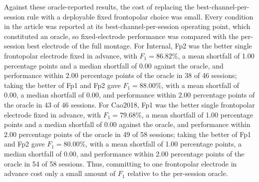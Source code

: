 Against these oracle-reported results, the cost of replacing the best-channel-per-session rule with a deployable fixed frontopolar choice was small.
Every condition in the article was reported at its best-channel-per-session operating point, which constituted an oracle, so fixed-electrode performance was compared with the per-session best electrode of the full montage.
For Internal, Fp2 was the better single frontopolar electrode fixed in advance, with $F_1=86.82\%$, a mean shortfall of 1.00 percentage points and a median shortfall of 0.00 against the oracle, and performance within 2.00 percentage points of the oracle in 38 of 46 sessions; taking the better of Fp1 and Fp2 gave $F_1=88.00\%$, with a mean shortfall of 0.00, a median shortfall of 0.00, and performance within 2.00 percentage points of the oracle in 43 of 46 sessions. For Cao2018, Fp1 was the better single frontopolar electrode fixed in advance, with $F_1=79.68\%$, a mean shortfall of 1.00 percentage points and a median shortfall of 0.00 against the oracle, and performance within 2.00 percentage points of the oracle in 49 of 58 sessions; taking the better of Fp1 and Fp2 gave $F_1=80.00\%$, with a mean shortfall of 1.00 percentage points, a median shortfall of 0.00, and performance within 2.00 percentage points of the oracle in 54 of 58 sessions. Thus, committing to one frontopolar electrode in advance cost only a small amount of $F_1$ relative to the per-session oracle.
